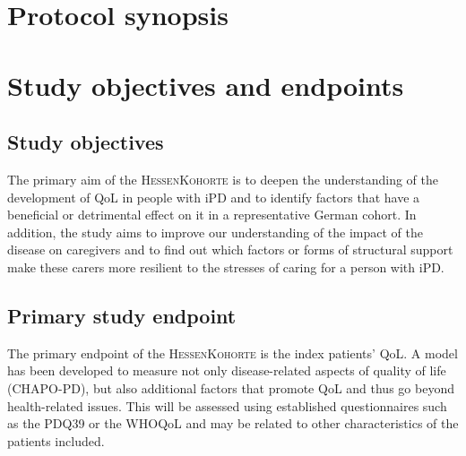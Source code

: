 
\section{Protocol synopsis}
\newpage


\section{Study objectives and endpoints}
\subsection{Study objectives}
The primary aim of the \textsc{HessenKohorte} is to deepen the understanding of the development of \ac{QoL} in people with \ac{iPD} and to identify factors that have a beneficial or detrimental effect on it in a representative German cohort. In addition, the study aims to improve our understanding of the impact of the disease on caregivers and to find out which factors or forms of structural support make these carers more resilient to the stresses of caring for a person with \ac{iPD}.

\subsection{Primary study endpoint}
The primary endpoint of the \textsc{HessenKohorte} is the index patients' \ac{QoL}. A model has been developed to measure not only disease-related aspects of quality of life (\ac{CHAPO-PD}), but also additional factors that promote \ac{QoL} and thus go beyond health-related issues. This will be assessed using established questionnaires such as the \ac{PDQ39}\citep{jenkinson1997pdq39} or the \ac{WHOQoL}\citep{group1998world} and may be related to other characteristics of the patients included.

